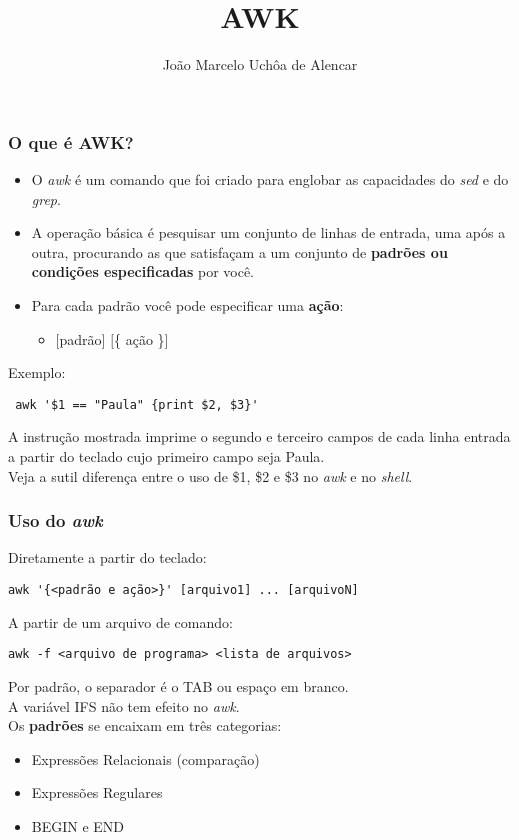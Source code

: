 \documentclass{beamer}
\title{AWK}
\author[João Marcelo Uchôa de Alencar]{João Marcelo Uchôa de Alencar}
\institute{Universidade Federal do Ceará - Quixadá}
\begin{document}
   \begin{frame}
      \titlepage
   \end{frame}

   \begin{frame}[fragile]
      \frametitle{O que é AWK?}
      \begin{itemize}
         \item O \textit{awk} é um comando que foi criado para englobar as capacidades do \textit{sed} e do \textit{grep}. 
         \item A operação básica é pesquisar um conjunto de linhas de entrada, uma após a outra, procurando as que satisfaçam a um conjunto de \textbf{padrões ou condições especificadas} por você. 
         \item Para cada padrão você pode especificar uma \textbf{ação}:
         \begin{itemize}
            \item $[$padrão$]$ $[$\{ ação \}$]$
         \end{itemize}   
      \end{itemize}	 
      \begin{block}{Exemplo:}
      \begin{verbatim}
 awk '$1 == "Paula" {print $2, $3}' 
      \end{verbatim}
      \end{block}
      A instrução mostrada imprime o segundo e terceiro campos de cada linha entrada a partir do teclado cujo primeiro campo seja Paula. \\
      Veja a sutil diferença entre o uso de \$1, \$2 e \$3 no \textit{awk} e no \textit{shell}. \\
\end{frame}

   \begin{frame}[fragile]
      \frametitle{Uso do \textit{awk}}
      \begin{block}{Diretamente a partir do teclado:}
      \begin{verbatim}
awk '{<padrão e ação>}' [arquivo1] ... [arquivoN] 
      \end{verbatim}
      \end{block}
      \begin{block}{A partir de um arquivo de comando:}
      \begin{verbatim}
awk -f <arquivo de programa> <lista de arquivos> 
      \end{verbatim}
      \end{block}
      Por padrão, o separador é o TAB ou espaço em branco. \\
      A variável IFS não tem efeito no \textit{awk}. \\
      Os \textbf{padrões} se encaixam em três categorias:
      \begin{itemize}
         \item Expressões Relacionais (comparação)
	 \item Expressões Regulares
	 \item BEGIN e END
      \end{itemize}
\end{frame}
\end{document}
